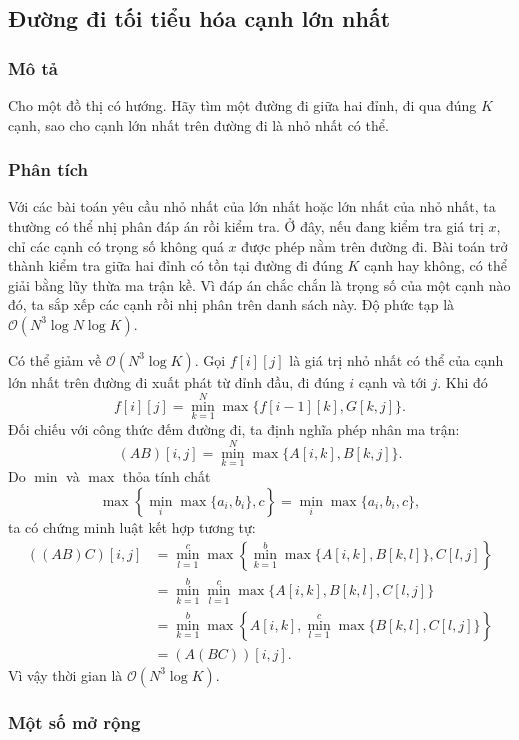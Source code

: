 \documentclass[11pt]{article}
\newcommand{\Oh}{\mathcal{O}}
\begin{document}
\subsection{Đường đi tối tiểu hóa cạnh lớn nhất}

\subsubsection{Mô tả}

Cho một đồ thị có hướng. Hãy tìm một đường đi giữa hai đỉnh, đi qua đúng \(K\)
cạnh, sao cho cạnh lớn nhất trên đường đi là nhỏ nhất có thể.

\subsubsection{Phân tích}

Với các bài toán yêu cầu nhỏ nhất của lớn nhất hoặc lớn nhất của nhỏ nhất, ta
thường có thể nhị phân đáp án rồi kiểm tra. Ở đây, nếu đang kiểm tra giá trị
\(x\), chỉ các cạnh có trọng số không quá \(x\) được phép nằm trên đường đi.
Bài toán trở thành kiểm tra giữa hai đỉnh có tồn tại đường đi đúng \(K\) cạnh
hay không, có thể giải bằng lũy thừa ma trận kề. Vì đáp án chắc chắn là trọng
số của một cạnh nào đó, ta sắp xếp các cạnh rồi nhị phân trên danh sách này.
Độ phức tạp là \(\Oh(N^3\log N\log K)\).

Có thể giảm về \(\Oh(N^3\log K)\). Gọi \(f[i][j]\) là giá trị nhỏ nhất có thể
của cạnh lớn nhất trên đường đi xuất phát từ đỉnh đầu, đi đúng \(i\) cạnh và
tới \(j\). Khi đó
\[
  f[i][j]=\min_{k=1}^{N}\max\{f[i-1][k],G[k,j]\}.
\]
Đối chiếu với công thức đếm đường đi, ta định nghĩa phép nhân ma trận:
\[
  (AB)[i,j]=\min_{k=1}^{N}\max\{A[i,k],B[k,j]\}.
\]
Do \(\min\) và \(\max\) thỏa tính chất
\[
  \max\left\{\min_i \max\{a_i,b_i\},c\right\}
  =
  \min_i \max\{a_i,b_i,c\},
\]
ta có chứng minh luật kết hợp tương tự:
\[
\begin{aligned}
  ((AB)C)[i,j]
  &=
  \min_{l=1}^{c}\max\left\{
    \min_{k=1}^{b}\max\{A[i,k],B[k,l]\}, C[l,j]\right\}\\
  &=
  \min_{k=1}^{b}\min_{l=1}^{c}
    \max\{A[i,k],B[k,l],C[l,j]\}\\
  &=
  \min_{k=1}^{b}\max\left\{A[i,k],
    \min_{l=1}^{c}\max\{B[k,l],C[l,j]\}\right\}\\
  &=(A(BC))[i,j].
\end{aligned}
\]
Vì vậy thời gian là \(\Oh(N^3\log K)\).

\subsubsection{Một số mở rộng}
\end{document}
